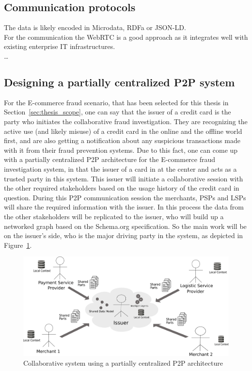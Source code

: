 
\subsection{Communication protocols}
\label{subsec:comm_protocol}

 The data is likely encoded in Microdata, \gls{RDFa} or \gls{JSON-LD}. \\

For the communication the \gls{WebRTC} is a good approach as it integrates well with existing enterprise IT infrastructures.
\\

\ldots


\subsection{Designing a partially centralized \gls{P2P} system}
\label{subsec:p2p_partially_centralized_system}

For the \gls{E-commerce} fraud scenario, that has been selected for this thesis in Section~\ref{sec:thesis_scope}, one can say that the issuer of a credit card is the party who initiates the collaborative fraud investigation. They are recognizing the active use (and likely misuse) of a credit card in the online and the offline world first, and are also getting a notification about any suspicious transactions made with it from their fraud prevention systems. Due to this fact, one can come up with a partially centralized \gls{P2P} architecture for the \gls{E-commerce} fraud investigation system, in that the issuer of a card in at the center and acts as a trusted party in this system. This issuer will initiate a collaborative session with the other required stakeholders based on the usage history of the credit card in question. During this \gls{P2P} communication session the merchants, \gls{PSP}s and \gls{LSP}s will share the required information with the issuer. In this process the data from the other stakeholders will be replicated to the issuer, who will build up a networked graph based on the Schema.org specification. So the main work will be on the issuer's side, who is the major driving party in the system, as depicted in Figure~\ref{fig:images_p2p_centralized}.\@

\begin{figure}[H]
	\centering
		\includegraphics[width=0.9\columnwidth]{images/system_P2P_centralized.pdf}
	\caption{Collaborative system using a partially centralized \gls{P2P} architecture}
\label{fig:images_p2p_centralized}
\end{figure}

